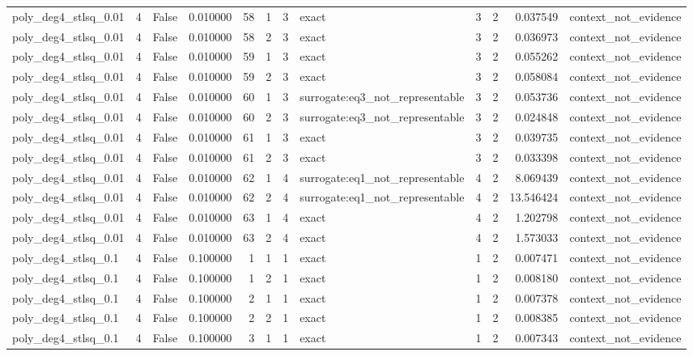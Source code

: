 \begin{tabular}{lrrrrrrlrrrl}
poly\_deg4\_stlsq\_0.01 & 4 & False & 0.010000 & 58 & 1 & 3 & exact & 3 & 2 & 0.037549 & context\_not\_evidence \\
poly\_deg4\_stlsq\_0.01 & 4 & False & 0.010000 & 58 & 2 & 3 & exact & 3 & 2 & 0.036973 & context\_not\_evidence \\
poly\_deg4\_stlsq\_0.01 & 4 & False & 0.010000 & 59 & 1 & 3 & exact & 3 & 2 & 0.055262 & context\_not\_evidence \\
poly\_deg4\_stlsq\_0.01 & 4 & False & 0.010000 & 59 & 2 & 3 & exact & 3 & 2 & 0.058084 & context\_not\_evidence \\
poly\_deg4\_stlsq\_0.01 & 4 & False & 0.010000 & 60 & 1 & 3 & surrogate:eq3\_not\_representable & 3 & 2 & 0.053736 & context\_not\_evidence \\
poly\_deg4\_stlsq\_0.01 & 4 & False & 0.010000 & 60 & 2 & 3 & surrogate:eq3\_not\_representable & 3 & 2 & 0.024848 & context\_not\_evidence \\
poly\_deg4\_stlsq\_0.01 & 4 & False & 0.010000 & 61 & 1 & 3 & exact & 3 & 2 & 0.039735 & context\_not\_evidence \\
poly\_deg4\_stlsq\_0.01 & 4 & False & 0.010000 & 61 & 2 & 3 & exact & 3 & 2 & 0.033398 & context\_not\_evidence \\
poly\_deg4\_stlsq\_0.01 & 4 & False & 0.010000 & 62 & 1 & 4 & surrogate:eq1\_not\_representable & 4 & 2 & 8.069439 & context\_not\_evidence \\
poly\_deg4\_stlsq\_0.01 & 4 & False & 0.010000 & 62 & 2 & 4 & surrogate:eq1\_not\_representable & 4 & 2 & 13.546424 & context\_not\_evidence \\
poly\_deg4\_stlsq\_0.01 & 4 & False & 0.010000 & 63 & 1 & 4 & exact & 4 & 2 & 1.202798 & context\_not\_evidence \\
poly\_deg4\_stlsq\_0.01 & 4 & False & 0.010000 & 63 & 2 & 4 & exact & 4 & 2 & 1.573033 & context\_not\_evidence \\
poly\_deg4\_stlsq\_0.1 & 4 & False & 0.100000 & 1 & 1 & 1 & exact & 1 & 2 & 0.007471 & context\_not\_evidence \\
poly\_deg4\_stlsq\_0.1 & 4 & False & 0.100000 & 1 & 2 & 1 & exact & 1 & 2 & 0.008180 & context\_not\_evidence \\
poly\_deg4\_stlsq\_0.1 & 4 & False & 0.100000 & 2 & 1 & 1 & exact & 1 & 2 & 0.007378 & context\_not\_evidence \\
poly\_deg4\_stlsq\_0.1 & 4 & False & 0.100000 & 2 & 2 & 1 & exact & 1 & 2 & 0.008385 & context\_not\_evidence \\
poly\_deg4\_stlsq\_0.1 & 4 & False & 0.100000 & 3 & 1 & 1 & exact & 1 & 2 & 0.007343 & context\_not\_evidence \\

\end{tabular}
